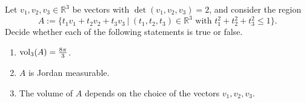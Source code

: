 \begin{aiexercise}
\label{ex:ai_spanned_ellipsoid_volume}
Let $v_1, v_2, v_3 \in \mathbb{R}^3$ be vectors with $\det(v_1, v_2, v_3) = 2$, and consider the
region
\[ A := \big\{ t_1 v_1 + t_2 v_2 + t_3 v_3 \ \big|\ (t_1, t_2, t_3) \in \mathbb{R}^3
  \text{ with } t_1^2 + t_2^2 + t_3^2 \le 1 \big\}. \]
Decide whether each of the following statements is true or false.
\begin{enumerate}[label=\textbf{(\alph*)}]
  \item $\operatorname{vol}_3(A) = \frac{8\pi}{3}$.
  \item $A$ is Jordan measurable.
  \item The volume of $A$ depends on the choice of the vectors $v_1, v_2, v_3$.
\end{enumerate}
\end{aiexercise}

